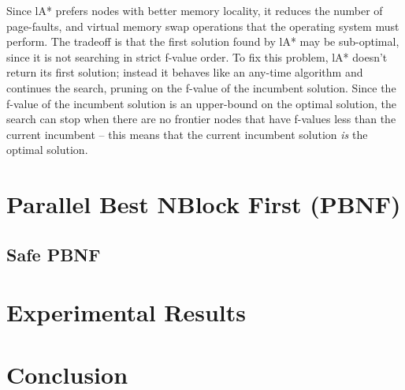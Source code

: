 \documentclass{article} \usepackage{aaai} \usepackage{graphicx}
\begin{document}
Since lA* prefers nodes with better memory locality, it reduces the
number of page-faults, and virtual memory swap operations that the
operating system must perform.  The tradeoff is that the first
solution found by lA* may be sub-optimal, since it is not searching in
strict f-value order.  To fix this problem, lA* doesn't return its
first solution; instead it behaves like an any-time algorithm and
continues the search, pruning on the f-value of the incumbent
solution.  Since the f-value of the incumbent solution is an
upper-bound on the optimal solution, the search can stop when there
are no frontier nodes that have f-values less than the current
incumbent -- this means that the current incumbent solution \emph{is}
the optimal solution.

\section{Parallel Best NBlock First (PBNF)}
\subsection{Safe PBNF}
\section{Experimental Results}
\section{Conclusion}



\end{document}

